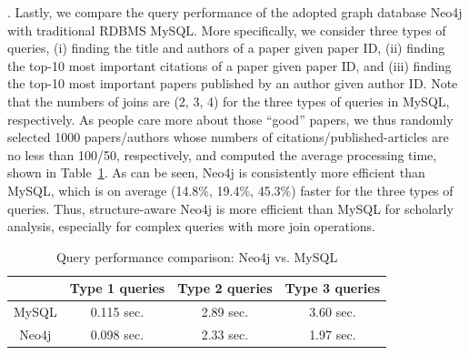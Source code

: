 .
Lastly, we compare the query performance of the adopted graph database Neo4j with traditional RDBMS MySQL. More specifically, we consider three types of queries, \ie (i) finding the title and authors of a paper given paper ID, (ii) finding the top-10 most important citations of a paper given paper ID, and (iii) finding the top-10 most important papers published by an author given author ID.
Note that the numbers of joins are (2, 3, 4) for the three types of queries in MySQL, respectively. As people care more about those ``good'' papers, we thus randomly selected 1000 papers/authors whose numbers of citations/published-articles are no less than 100/50, respectively, and computed the average processing time, shown in Table~\ref{tab-compare}.
As can be seen, Neo4j is consistently more efficient than MySQL, which is on average (14.8\%, 19.4\%, 45.3\%) faster for the three types of queries.
Thus, structure-aware Neo4j is more efficient than MySQL for scholarly analysis, especially for complex queries with more join operations.


\begin{table}[t!]
\begin{center}
\caption{Query performance comparison: Neo4j vs. MySQL}
\vspace{-1ex}
\label{tab-compare}
\begin{scriptsize}
\begin{tabular}{c c c c} %
\hline
{} & {Type 1 queries} & {Type 2 queries} & {Type 3 queries}\\
\hline
MySQL & 0.115 sec.  & 2.89 sec. & 3.60 sec. \\
Neo4j & 0.098 sec.  & 2.33 sec. & 1.97 sec. \\
\hline
\end{tabular}
\end{scriptsize}
\vspace{-3ex}
\end{center}
\end{table}



